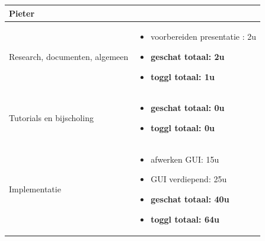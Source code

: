 \documentclass{article}
\begin{document}

\begin{center}
\begin{tabularx}{\textwidth}[t]{XX}
\arrayrulecolor{green}\hline

\arrayrulecolor{green}\hline
\vspace{.1 mm}
\textbf{\textcolor{myGreen}{\large{Pieter}}} \vspace{.1 mm} & \\
\hline
\vspace{1 mm}
Research, documenten, algemeen & 
\begin{minipage}[t]{\linewidth}%
\vspace{1 mm}
\begin{itemize}
\item voorbereiden presentatie : 2u
\item \textbf{geschat totaal: 2u}
\item \textbf{toggl totaal: 1u}
\end{itemize} 
\vspace{1 mm}
\end{minipage}\\

\arrayrulecolor{black}\hline

\vspace{1 mm}
Tutorials en bijscholing & 
\begin{minipage}[t]{\linewidth}%
\vspace{1 mm}
\begin{itemize}
\item \textbf{geschat totaal: 0u}
\item \textbf{toggl totaal: 0u}
\end{itemize} 
\vspace{1 mm}
\end{minipage}\\

\arrayrulecolor{black}\hline


\vspace{1 mm}
Implementatie & 
\begin{minipage}[t]{\linewidth}%
\vspace{1 mm}
\begin{itemize}
\item afwerken GUI: 15u
\item GUI verdiepend: 25u
\item \textbf{geschat totaal: 40u}
\item \textbf{toggl totaal: 64u}
\end{itemize} 
\vspace{1 mm}
\end{minipage}\\



\end{tabularx}
\end{center}
\end{document}
